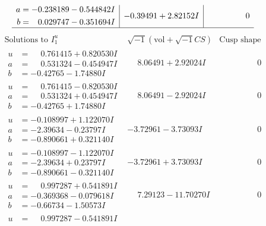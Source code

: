 \documentclass[1p]{elsarticle_modified}
\theoremstyle{definition}
\newcommand{\I}{\sqrt{-1}}
\begin{document}
$$\begin{array}{c|c|c}
\begin{aligned}
a &= -0.238189 - 0.544842 I \\
b &= \phantom{-}0.029747 - 0.351694 I\end{aligned}
 & -0.39491 + 2.82152 I & \phantom{-0.000000 } 0\\
 \hline 
 \end{array}$$\newpage$$\begin{array}{c|c|c}  
\text{Solutions to }I^u_{1}& \I (\text{vol} + \sqrt{-1}CS) & \text{Cusp shape}\\
 \hline 
\begin{aligned}
u &= \phantom{-}0.761415 + 0.820530 I \\
a &= \phantom{-}0.531324 - 0.454947 I \\
b &= -0.42765 - 1.74880 I\end{aligned}
 & \phantom{-}8.06491 + 2.92024 I & \phantom{-0.000000 } 0 \\ \hline\begin{aligned}
u &= \phantom{-}0.761415 - 0.820530 I \\
a &= \phantom{-}0.531324 + 0.454947 I \\
b &= -0.42765 + 1.74880 I\end{aligned}
 & \phantom{-}8.06491 - 2.92024 I & \phantom{-0.000000 } 0 \\ \hline\begin{aligned}
u &= -0.108997 + 1.122070 I \\
a &= -2.39634 - 0.23797 I \\
b &= -0.890661 + 0.321140 I\end{aligned}
 & -3.72961 - 3.73093 I & \phantom{-0.000000 } 0 \\ \hline\begin{aligned}
u &= -0.108997 - 1.122070 I \\
a &= -2.39634 + 0.23797 I \\
b &= -0.890661 - 0.321140 I\end{aligned}
 & -3.72961 + 3.73093 I & \phantom{-0.000000 } 0 \\ \hline\begin{aligned}
u &= \phantom{-}0.997287 + 0.541891 I \\
a &= -0.369368 - 0.079618 I \\
b &= -0.66734 - 1.50573 I\end{aligned}
 & \phantom{-}7.29123 - 11.70270 I & \phantom{-0.000000 } 0 \\ \hline\begin{aligned}
u &= \phantom{-}0.997287 - 0.541891 I \\

\end{aligned}
\end{array}$$
\end{document}
